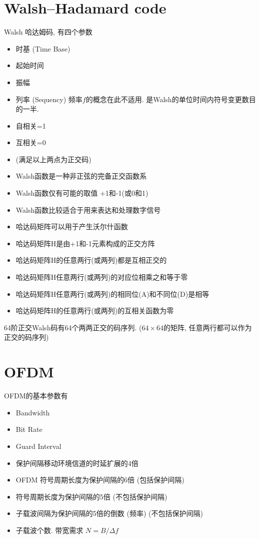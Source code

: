 \documentclass[a4paper]{report}
\begin{document}
\section{Walsh–Hadamard code}
Walsh 哈达姆码, 有四个参数
\begin{itemize}
	\item 时基 (Time Base)
	\item 起始时间
	\item 振幅
	\item 列率 (Sequency)
	\subitem 频率$f$的概念在此不适用. 是Walsh的单位时间内符号变更数目的一半. 
\end{itemize}
\begin{itemize}
	\item 自相关=1
	\item 互相关=0
	\item (满足以上两点为正交码)

	\item Walsh函数是一种非正弦的完备正交函数系
	\item Walsh函数仅有可能的取值 +1和-1(或0和1)
	\item Walsh函数比较适合于用来表达和处理数字信号

	\item 哈达码矩阵可以用于产生沃尔什函数
	\item 哈达码矩阵H是由+1和-1元素构成的正交方阵
	\item 哈达码矩阵H的任意两行(或两列)都是互相正交的
	\item 哈达码矩阵H任意两行(或两列)的对应位相乘之和等于零
	\item 哈达码矩阵H任意两行(或两列)的相同位(A)和不同位(D)是相等
	\item 哈达码矩阵H的任意两行(或两列)的互相关函数为零
\end{itemize}
64阶正交Walsh码有64个两两正交的码序列. ($64\times 64$的矩阵, 任意两行都可以作为正交的码序列)

\section{OFDM}
OFDM的基本参数有
\begin{itemize}
	\item Bandwidth
	\item Bit Rate
	\item Guard Interval
\end{itemize}

\begin{itemize}
	\item 保护间隔移动环境信道的时延扩展的4倍
	\item OFDM 符号周期长度为保护间隔的6倍 (包括保护间隔)
	\item 符号周期长度为保护间隔的5倍 (不包括保护间隔)
	\item 子载波间隔为保护间隔的5倍的倒数 (频率) (不包括保护间隔)
	\item 子载波个数. 带宽需求 $N=B/\Delta f$
\end{itemize}
\end{document}
